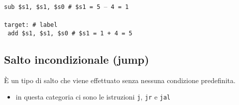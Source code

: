 \documentclass[../main.tex]{subfiles}
\begin{document}
\texttt{sub \$s1, \$s1, \$s0 \hspace*{0cm} \hspace*{0cm} \hspace*{0cm} \hspace*{0cm} \# \$s1 = 5 $–$ 4 = 1} \\
\\
\texttt{target: \hspace*{0cm} \hspace*{0cm} \hspace*{0cm} \hspace*{0cm} \hspace*{0cm} \hspace*{0cm} \hspace*{0cm} \hspace*{0cm} \hspace*{0cm} \hspace*{0cm} \hspace*{0cm} \hspace*{0cm} \hspace*{0cm} \# label} \\
\texttt{\hspace*{0cm} \hspace*{0cm} add \$s1, \$s1, \$s0 \hspace*{0cm} \hspace*{0cm} \# \$s1 = 1 + 4 = 5} \\

\newpage

\subsection{Salto incondizionale (jump)}
È un tipo di salto che viene effettuato senza nessuna condizione predefinita.
\begin{itemize}
    \item in questa categoria ci sono le istruzioni
    \texttt{j}, \texttt{jr} e \texttt{jal}
\end{itemize}

\vspace*{-4mm}
\end{document}
